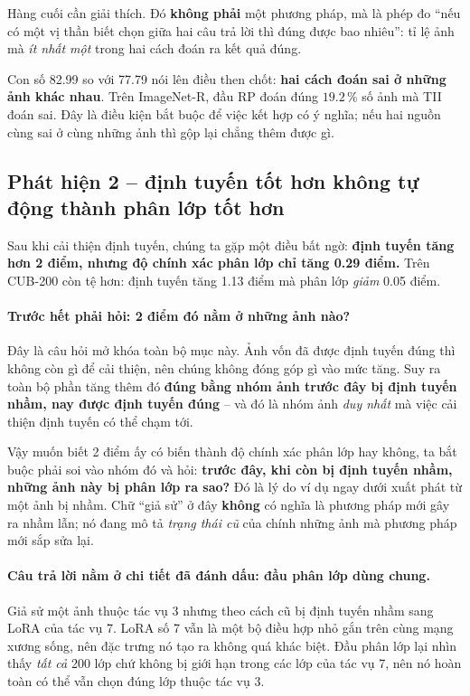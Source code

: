 \documentclass[11pt,a4paper]{article}
\begin{document}
Hàng cuối cần giải thích. Đó \textbf{không phải} một phương pháp, mà là phép đo
``nếu có một vị thần biết chọn giữa hai câu trả lời thì đúng được bao nhiêu'':
tỉ lệ ảnh mà \emph{ít nhất một} trong hai cách đoán ra kết quả đúng.

Con số 82.99 so với 77.79 nói lên điều then chốt: \textbf{hai cách đoán sai ở
những ảnh khác nhau}. Trên ImageNet-R, đầu RP đoán đúng $19.2\,\%$ số ảnh mà TII
đoán sai. Đây là điều kiện bắt buộc để việc kết hợp có ý nghĩa; nếu hai nguồn
cùng sai ở cùng những ảnh thì gộp lại chẳng thêm được gì.

\subsection{Phát hiện 2 -- định tuyến tốt hơn không tự động thành phân lớp tốt hơn}
\label{sec:phat-hien-2}

Sau khi cải thiện định tuyến, chúng ta gặp một điều bất ngờ: \textbf{định tuyến
tăng hơn 2 điểm, nhưng độ chính xác phân lớp chỉ tăng 0.29 điểm.} Trên CUB-200
còn tệ hơn: định tuyến tăng 1.13 điểm mà phân lớp \emph{giảm} 0.05 điểm.

\paragraph{Trước hết phải hỏi: 2 điểm đó nằm ở những ảnh nào?}
Đây là câu hỏi mở khóa toàn bộ mục này. Ảnh vốn đã được định tuyến đúng thì không
còn gì để cải thiện, nên chúng không đóng góp gì vào mức tăng. Suy ra toàn bộ
phần tăng thêm đó \textbf{đúng bằng nhóm ảnh trước đây bị định tuyến nhầm, nay
được định tuyến đúng} -- và đó là nhóm ảnh \emph{duy nhất} mà việc cải thiện định
tuyến có thể chạm tới.

Vậy muốn biết 2 điểm ấy có biến thành độ chính xác phân lớp hay không, ta bắt
buộc phải soi vào nhóm đó và hỏi: \textbf{trước đây, khi còn bị định tuyến nhầm,
những ảnh này bị phân lớp ra sao?} Đó là lý do ví dụ ngay dưới xuất phát từ một
ảnh bị nhầm. Chữ ``giả sử'' ở đây \textbf{không} có nghĩa là phương pháp mới gây
ra nhầm lẫn; nó đang mô tả \emph{trạng thái cũ} của chính những ảnh mà phương
pháp mới sắp sửa lại.

\paragraph{Câu trả lời nằm ở chi tiết đã đánh dấu: đầu phân lớp dùng chung.}
Giả sử một ảnh thuộc tác vụ 3 nhưng theo cách cũ bị định tuyến nhầm sang LoRA của
tác vụ 7. LoRA số 7 vẫn là một bộ điều hợp nhỏ gắn trên cùng mạng xương sống, nên
đặc trưng nó tạo ra không quá khác biệt. Đầu phân lớp lại nhìn thấy \emph{tất cả}
200 lớp chứ không bị giới hạn trong các lớp của tác vụ 7, nên nó hoàn toàn có thể
vẫn chọn đúng lớp thuộc tác vụ 3.
\end{document}
